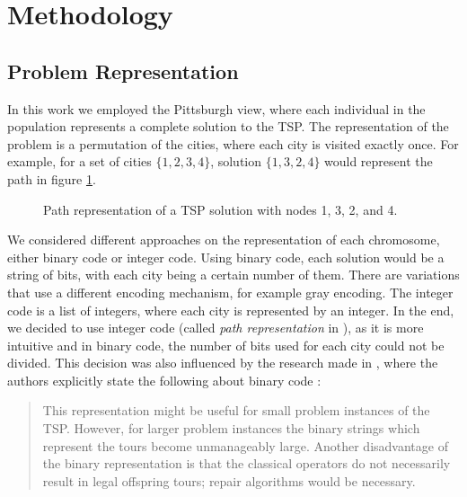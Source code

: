 \documentclass[12pt]{article}
\begin{document}
\section{Methodology}
\subsection{Problem Representation}
In this work we employed the Pittsburgh view, where each individual in the population represents a complete solution to the TSP. The representation of the problem is a permutation of the cities, where each city is visited exactly once. For example, for a set of cities $\{1,2,3,4\}$, solution $\{1,3,2,4\}$ would represent the path in figure \ref{fig:tsp_example}.

\begin{figure}[h]
    \centering
    \caption{Path representation of a TSP solution with nodes 1, 3, 2, and 4.}
    \label{fig:tsp_example}
\end{figure}


We considered different approaches on the representation of each chromosome, either binary code or integer code. Using binary code, each solution would be a string of bits, with each city being a certain number of them. There are variations that use a different encoding mechanism, for example gray encoding. The integer code is a list of integers, where each city is represented by an integer. In the end, we decided to use integer code (called \textit{path representation} in \cite{Larranaga1999}), as it is more intuitive and in binary code, the number of bits used for each city could not be divided. This decision was also influenced by the research made in \cite{Larranaga1999}, where the authors explicitly state the following about binary code :
\begin{quote}
This representation might be useful for small problem instances of the TSP.
However, for larger problem instances the binary strings which represent
the tours become unmanageably large. Another disadvantage of the binary
representation is that the classical operators do not necessarily result in legal
offspring tours; repair algorithms would be necessary.
\end{quote}
\end{document}
